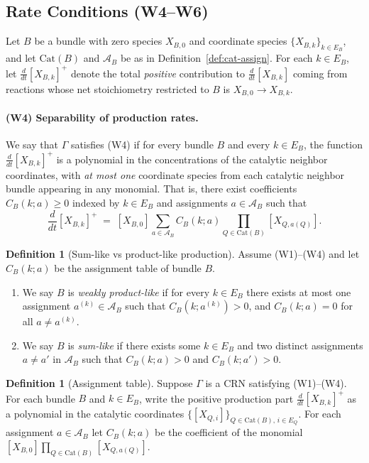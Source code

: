\documentclass{article}
\theoremstyle{plain}
\theoremstyle{definition}
\newtheorem{definition}[theorem]{Definition}
\theoremstyle{remark}
\newcommand{\Cat}{\textrm{Cat}}
\newcommand{\<}{\langle}
\renewcommand{\>}{\rangle}
\newcommand{\rate}{\frac{d}{dt}}
\begin{document}
\subsection{Rate Conditions (W4--W6)}
Let $B$ be a bundle with zero species $X_{B,0}$ and coordinate species
$\{X_{B,k}\}_{k\in E_B}$, and let $\Cat(B)$ and $\mathcal A_B$ be as in
Definition~\ref{def:cat-assign}. For each $k\in E_B$, let $\rate [X_{B,k}]^+$ denote
the total \emph{positive} contribution to $\frac{d}{dt}[X_{B,k}]$ coming from
reactions whose net stoichiometry restricted to $B$ is $X_{B,0}\to X_{B,k}$.
\paragraph{(W4) Separability of production rates.}
We say that $\Gamma$ satisfies \textup{(W4)} if for every bundle $B$ and every $k\in E_B$, the function $\rate [X_{B,k}]^+$ is a polynomial in the
concentrations of the catalytic neighbor coordinates, with \emph{at most one}
coordinate species from each catalytic neighbor bundle appearing in any
monomial. That is, there exist coefficients $C_B(k;a)\ge 0$ indexed by
$k\in E_B$ and assignments $a\in\mathcal A_B$ such that
\[
  \rate [X_{B,k}]^+
  \;=\;
  [X_{B,0}] \sum_{a\in\mathcal A_B} C_B(k;a)\prod_{Q\in\Cat(B)}[X_{Q,a(Q)}].
\]

\begin{definition}[Sum-like vs product-like production]\label{def:sum-prod-like}
Assume \textup{(W1)--(W4)} and let $C_B(k;a)$ be the assignment table of bundle $B$.

\begin{enumerate}
\item We say $B$ is \emph{weakly product-like} if for every $k\in E_B$ there exists
at most one assignment $a^{(k)}\in\mathcal A_B$ such that $C_B(k;a^{(k)})>0$,
and $C_B(k;a)=0$ for all $a\neq a^{(k)}$.

\item We say $B$ is \emph{sum-like} if there exists some $k\in E_B$ and two
distinct assignments $a\neq a'$ in $\mathcal A_B$ such that
$C_B(k;a)>0$ and $C_B(k;a')>0$.
\end{enumerate}
\end{definition}

\begin{definition}[Assignment table]\label{def:assign-table}
Suppose $\Gamma$ is a CRN satisfying \textup{(W1)--(W4)}. For each bundle $B$ and $k\in E_B$, write the
positive production part $\rate [X_{B,k}]^+$ as a polynomial in
the catalytic coordinates $\{[X_{Q,i}]\}_{Q\in\Cat(B),\, i\in E_Q}$.
For each assignment
$a\in\mathcal A_B$
let $C_B(k;a)$ be the coefficient of the monomial
$[X_{B,0}]\prod_{Q\in\Cat(B)}[X_{Q,a(Q)}].$
\end{definition}
\end{document}
